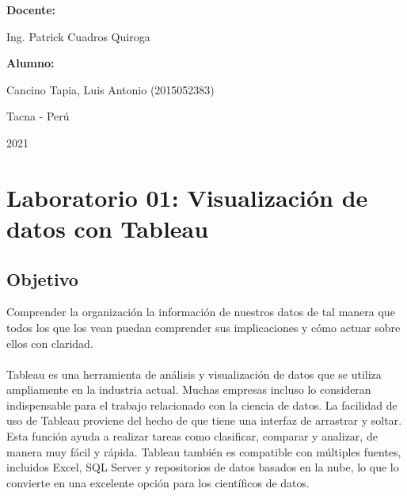 \documentclass[12pt,letterpaper]{article}
\begin{document}
\begin{titlepage}
\begin{center}
\vspace*{0.3in}
\begin{Large}
\textbf{Docente:} \\
\end{Large}

\vspace*{0.1in}
\begin{large}
Ing. Patrick Cuadros Quiroga\\
\end{large}

\vspace*{0.2in}
\vspace*{0.1in}
\begin{large}
\textbf{Alumno:} \\
\begin{flushleft}
    Cancino Tapia, Luis Antonio		\hfill	(2015052383) \\


\end{flushleft}
\end{large}
\vspace*{0.1in}
\begin{large}
Tacna - Perú\\
\end{large}
\vspace*{0.1in}
\begin{large}
2021\\
\end{large}

\end{center}

\end{titlepage}



\tableofcontents %
\thispagestyle{empty} %
\newpage
\setcounter{page}{1} %



\section*{Laboratorio 01: Visualización de datos con Tableau}
\subsection*{Objetivo} 
Comprender la organización la información de nuestros datos de tal manera que todos los que los vean 
puedan comprender sus implicaciones y cómo actuar sobre ellos con claridad.
\\\\Tableau es una herramienta de análisis y visualización de datos que se utiliza ampliamente en la
industria actual. Muchas empresas incluso lo consideran indispensable para el trabajo relacionado con
la ciencia de datos. La facilidad de uso de Tableau proviene del hecho de que tiene una interfaz de
arrastrar y soltar. Esta función ayuda a realizar tareas como clasificar, comparar y analizar, de manera
muy fácil y rápida. Tableau también es compatible con múltiples fuentes, incluidos Excel, SQL Server
y repositorios de datos basados en la nube, lo que lo convierte en una excelente opción para los
científicos de datos.
\end{document}
